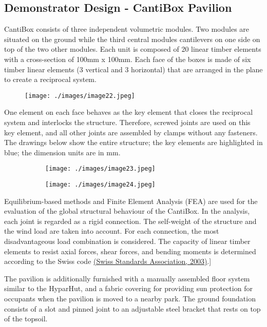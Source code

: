 \subsection{Demonstrator Design - CantiBox Pavilion}

CantiBox consists of three independent volumetric modules. Two modules are situated on the ground while the third central modules cantilevers on one side on top of the two other modules. Each unit is composed of 20 linear timber elements with a cross-section of 100mm x 100mm. Each face of the boxes is made of six timber linear elements (3 vertical and 3 horizontal) that are arranged in the plane to create a reciprocal system. 

\begin{figure}[H]
\texttt{[image: ./images/image22.jpeg]}
\end{figure}


One element on each face behaves as the key element that closes the reciprocal system and interlocks the structure. Therefore, screwed joints are used on this key element, and all other joints are assembled by clamps without any fasteners. The drawings below show the entire structure; the key elements are highlighted in blue; the dimension units are in mm. 

\begin{figure}[H]
\centering
\begin{subfigure}[b]{0.45\textwidth}
\centering
\texttt{[image: ./images/image23.jpeg]}
\end{subfigure}
\hfill
\begin{subfigure}[b]{0.45\textwidth}
\centering
\texttt{[image: ./images/image24.jpeg]}
\end{subfigure}
\end{figure}


Equilibrium-based methods and Finite Element Analysis (FEA) are used for the evaluation of the global structural behaviour of the CantiBox. In the analysis, each joint is regarded as a rigid connection. The self-weight of the structure and the wind load are taken into account. For each connection, the most disadvantageous load combination is considered. The capacity of linear timber elements to resist axial forces, shear forces, and bending moments is determined according to the Swiss code \href{https://www.zotero.org/google-docs/?canbQk}{(Swiss Standards Association, 2003)}.]

The pavilion is additionally furnished with a manually assembled floor system similar to the HyparHut, and a fabric covering for providing sun protection for occupants when the pavilion is moved to a nearby park. The ground foundation consists of a slot and pinned joint to an adjustable steel bracket that rests on top of the topsoil.

